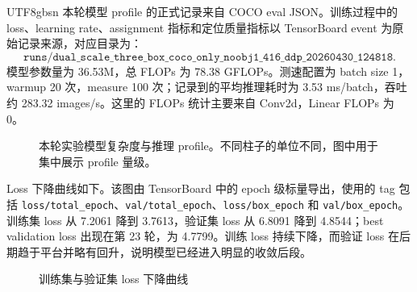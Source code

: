 \documentclass[11pt,a4paper]{article}
\newcommand{\code}[1]{\texttt{#1}}
\begin{document}
\begin{CJK*}{UTF8}{gbsn}
本轮模型 profile 的正式记录来自 COCO eval JSON。训练过程中的 loss、learning rate、assignment 指标和定位质量指标以 TensorBoard event 为原始记录来源，对应目录为：
\[
\code{runs/dual\_scale\_three\_box\_coco\_only\_noobj1\_416\_ddp\_20260430\_124818}.
\]
模型参数量为 36.53M，总 FLOPs 为 78.38 GFLOPs。测速配置为 batch size 1，warmup 20 次，measure 100 次；记录到的平均推理耗时为 3.53 ms/batch，吞吐约 283.32 images/s。这里的 FLOPs 统计主要来自 Conv2d，Linear FLOPs 为 0。

\begin{figure}[H]
\centering
{}
\caption{本轮实验模型复杂度与推理 profile。不同柱子的单位不同，图中用于集中展示 profile 量级。}
\end{figure}

Loss 下降曲线如下。该图由 TensorBoard 中的 epoch 级标量导出，使用的 tag 包括 \code{loss/total\_epoch}、\code{val/total\_epoch}、\code{loss/box\_epoch} 和 \code{val/box\_epoch}。训练集 loss 从 7.2061 降到 3.7613，验证集 loss 从 6.8091 降到 4.8544；best validation loss 出现在第 23 轮，为 4.7799。训练 loss 持续下降，而验证 loss 在后期趋于平台并略有回升，说明模型已经进入明显的收敛后段。

\begin{figure}[H]
\centering
{}
\caption{训练集与验证集 loss 下降曲线}
\end{figure}


\end{CJK*}
\end{document}
